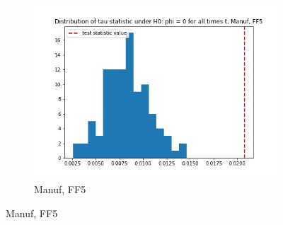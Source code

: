\documentclass{article}
\begin{document}
\begin{figure}
\begin{subfigure}[b]{0.3\textwidth}
    \includegraphics[width=\textwidth]{Manuf/tau_hist_02_FF5.jpg}
    \caption{Manuf, FF5}
    \label{fig:2}
  \end{subfigure}
  \end{figure}
\end{document}
